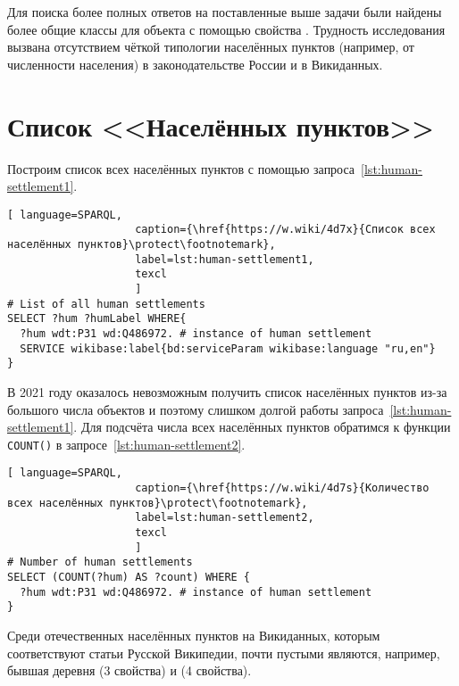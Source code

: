Для поиска более полных ответов на поставленные выше задачи  
были найдены более общие классы для объекта  
с помощью свойства . 
Трудность исследования вызвана отсутствием чёткой типологии населённых пунктов 
(например, от численности населения) в законодательстве России и в Викиданных.

\section{Список <<Населённых пунктов>>}

Построим список всех населённых пунктов с помощью запроса~\ref{lst:human-settlement1}.

\begin{lstlisting}[ language=SPARQL, 
                    caption={\href{https://w.wiki/4d7x}{Список всех населённых пунктов}\protect\footnotemark},
                    label=lst:human-settlement1,
                    texcl 
                    ]
# List of all human settlements
SELECT ?hum ?humLabel WHERE{
  ?hum wdt:P31 wd:Q486972. # instance of human settlement
  SERVICE wikibase:label{bd:serviceParam wikibase:language "ru,en"}
}
\end{lstlisting}%

В 2021 году оказалось невозможным получить список населённых пунктов 
из-за большого числа объектов и поэтому слишком долгой работы запроса~\ref{lst:human-settlement1}. 
Для подсчёта числа всех населённых пунктов обратимся к функции \lstinline|COUNT()| 
в запросе~\ref{lst:human-settlement2}.

\begin{lstlisting}[ language=SPARQL, 
                    caption={\href{https://w.wiki/4d7s}{Количество всех населённых пунктов}\protect\footnotemark},
                    label=lst:human-settlement2,
                    texcl 
                    ]
# Number of human settlements
SELECT (COUNT(?hum) AS ?count) WHERE {
  ?hum wdt:P31 wd:Q486972. # instance of human settlement  
}
\end{lstlisting}%

Среди отечественных населённых пунктов на Викиданных, 
которым соответствуют статьи Русской Википедии, 
почти пустыми являются, например, 
бывшая деревня  (3 свойства) 
и  (4 свойства).

